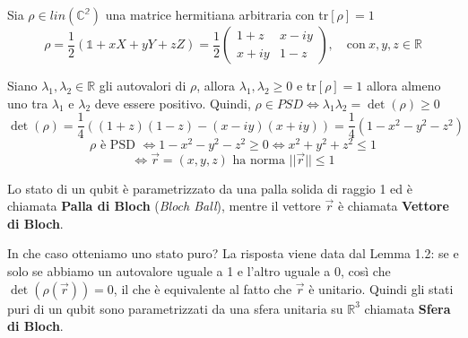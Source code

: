 \documentclass{report}
\begin{document}
Sia $\rho \in \textit{lin}(\mathbb{C^2})$ una matrice hermitiana arbitraria con tr$[\rho] = 1$
$$\rho = \frac{1}{2}\left( \mathbb{1} + xX + yY+zZ\right) = \frac{1}{2}
\begin{pmatrix}
    1+z & x-iy \\
    x+iy & 1-z
\end{pmatrix}, \quad \text{con}\  x,y,z\in \mathbb{R}$$
 
Siano $\lambda_1,\lambda_2 \in \mathbb{R}$ gli autovalori di $\rho$, allora $\lambda_1,\lambda_2 \ge 0$ e tr$[\rho]=1$
allora almeno uno tra $\lambda_1$ e $\lambda_2$ deve essere positivo. Quindi, $\rho \in \textit{PSD} \Leftrightarrow \lambda_1\lambda_2=\det(\rho)\ge0$
$$\det(\rho) = \frac{1}{4}\left( (1+z) (1-z) - (x-iy) (x+iy) \right) = \frac{1}{4}(1-x^2-y^2-z^2)$$
$$\rho \text{ è PSD } \Longleftrightarrow 1-x^2-y^2-z^2\ge 0 \Longleftrightarrow x^2+y^2+z^2 \le 1$$
$$ \Longleftrightarrow \vec{r}= (x,y,z) \text{ ha norma } ||\vec{r}|| \le1$$

Lo stato di un qubit è parametrizzato da una palla solida di raggio 1 ed è chiamata \textbf{Palla di Bloch} (\textit{Bloch Ball}), mentre il vettore $\vec{r}$ è chiamata \textbf{Vettore di Bloch}.

In che caso otteniamo uno stato puro? La risposta  viene data dal Lemma 1.2: se e solo se abbiamo un autovalore uguale a 1 e l'altro uguale a 0, così che $\det(\rho(\vec{r}))= 0$, il che è equivalente al fatto che $\vec{r}$ è unitario. Quindi gli stati puri di un qubit sono parametrizzati da una sfera unitaria su $\mathbb{R}^3$ chiamata \textbf{Sfera di Bloch}.
\end{document}
